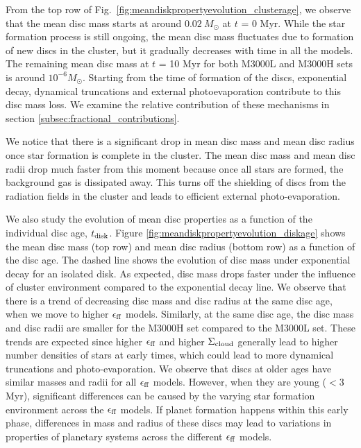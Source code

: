 \documentclass[fleqn,usenatbib]{mnras}
\newcommand\sfeff{\ensuremath{\epsilon_{\rm ff}}\xspace}   %
\newcommand\Sigmacloud{\ensuremath{\Sigma_{\rm cloud}}\xspace} %
\begin{document}

From the top row of Fig.~\ref{fig:meandiskpropertyevolution_clusterage}, we observe that the mean disc mass starts at around $0.02 \: M_\odot$ at $t$ = 0 Myr. While the star formation process is still ongoing, the mean disc mass fluctuates due to formation of new discs in the cluster, but it gradually decreases with time in all the models. The remaining mean disc mass at $t$ = 10 Myr for both M3000L and M3000H sets is around $10^{-6} M_\odot$. 
Starting from the time of formation of the discs, exponential decay, dynamical truncations and external photoevaporation contribute to this disc mass loss. We examine the relative contribution of these mechanisms in section \ref{subsec:fractional_contributions}.

We notice that there is a significant drop in mean disc mass and mean disc radius once star formation is complete in the cluster. The mean disc mass and mean disc radii drop much faster from this moment because once all stars are formed, the background gas is dissipated away. This turns off the shielding of discs from the radiation fields in the cluster and leads to efficient external photo-evaporation.  

We also study the evolution of mean disc properties as a function of the individual disc age, $t_{\rm disk}$. Figure \ref{fig:meandiskpropertyevolution_diskage} shows the mean disc mass (top row) and mean disc radius (bottom row) as a function of the disc age. The dashed line shows the evolution of disc mass under exponential decay for an isolated disk.
As expected, disc mass drops faster under the influence of cluster environment compared to the exponential decay line. We observe that there is a trend of decreasing disc mass and disc radius at the same disc age, when we move to higher \sfeff models. Similarly, at the same disc age, the disc mass and disc radii are smaller for the M3000H set compared to the M3000L set. These trends are expected since higher \sfeff and higher \Sigmacloud generally lead to higher number densities of stars at early times, which could lead to more dynamical truncations and photo-evaporation. We observe that discs at older ages have similar masses and radii for all \sfeff models. However, when they are young ($< 3$ Myr), significant differences can be caused by the varying star formation environment across the \sfeff models. If planet formation happens within this early phase, differences in mass and radius of these discs may lead to variations in properties of planetary systems across the different \sfeff models.  
\end{document}
